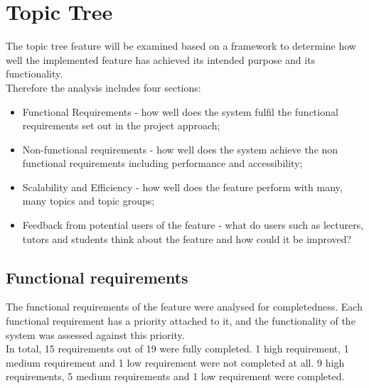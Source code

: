 \section{Topic Tree}

The topic tree feature will be examined based on a framework to determine how well the implemented feature has achieved its intended purpose and its functionality. \\

Therefore the analysis includes four sections:\\
\begin{itemize}
    \item Functional Requirements - how well does the system fulfil the functional requirements set out in the project approach;
    \item Non-functional requirements - how well does the system achieve the non functional requirements including performance and accessibility;
    \item Scalability and Efficiency - how well does the feature perform with many, many topics and topic groups;
    \item Feedback from potential users of the feature - what do users such as lecturers, tutors and students think about the feature and how could it be improved?
\end{itemize}

\subsection{Functional requirements}
The functional requirements of the feature were analysed for completedness. Each functional requirement has a priority attached to it, and the functionality of the system was assessed against this priority. \\

In total, 15 requirements out of 19 were fully completed. 1 high requirement, 1 medium requirement and 1 low requirement were not completed at all. 9 high requirements, 5 medium requirements and 1 low requirement were completed. \\

